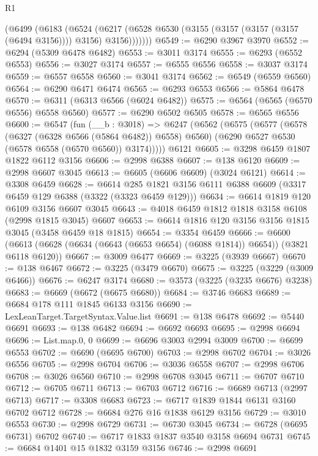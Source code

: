 \begin{lexlean}{R1}
\begin{coremodule}
        (@6499
          (@6183
            (@6524
              (@6217 (@6528 @6530 (@3155 (@3157 (@3157 (@3157 (@6494 @3156)))) @3156) @3156)))))))
@6549 := @6290 @3967 @3970
@6552 := @6294 (@5309 @6478 @6482)
@6553 := @3011 @3174
@6555 := @6293 (@6552 @6553)
@6556 := @3027 @3174
@6557 := @6555 @6556
@6558 := @3037 @3174
@6559 := @6557 @6558
@6560 := @3041 @3174
@6562 := @6549 (@6559 @6560)
@6564 := @6290 @6471 @6474
@6565 := @6293 @6553
@6566 := @5864 @6478
@6570 := @6311 (@6313 @6566 (@6024 @6482))
@6575 := @6564 (@6565 (@6570 @6556) @6558 @6560)
@6577 := @6290 @6502 @6505
@6578 := @6565 @6556
@6600 := @6547
    (fun (__b : @3018) =>
    @6247
      (@6562
        (@6575
          (@6577
            (@6578 (@6327 (@6328 @6566 (@5864 @6482)) @6558) @6560)
            (@6290 @6527 @6530 (@6578 @6558 (@6570 @6560)) @3174)))))
    @6121
@6605 := @3298 @6459 @1807 @1822 @6112 @3156
@6606 := @2998 @6388
@6607 := @138 @6120
@6609 := @2998 @6607 @3045
@6613 := @6605 (@6606 @6609) (@3024 @6121)
@6614 := @3308 @6459
@6628 := @6614
    @285
    @1821
    @3156
    @6111
    @6388
    @6609
    (@3317 @6459 @129 @6388 (@3322 (@3323 @6459 @129)))
@6634 := @6614 @1819 @120 @6109 @3156 @6607 @3045
@6643 := @4018 @6459 @1812 @1818 @3158 @6108 (@2998 @1815 @3045) @6607
@6653 := @6614 @1816 @120 @3156 @3156 @1815 @3045 (@3458 @6459 @18 @1815)
@6654 := @3354 @6459
@6666 := @6600 (@6613 (@6628 (@6634 (@6643 (@6653 @6654) (@6088 @1814)) @6654)) (@3821 @6118 @6120))
@6667 := @3009 @6477
@6669 := @3225 (@3939 @6667)
@6670 := @138 @6467
@6672 := @3225 (@3479 @6670)
@6675 := @3225 (@3229 (@3009 @6466))
@6676 := @6247 @3174
@6680 := @3573 (@3225 (@3235 @6676) @3238)
@6683 := @6669 (@6672 (@6675 @6680))
@6684 := @3746 @6683
@6689 := @6684 @178 @111 @1845 @6133 @3156
@6690 := LexLeanTarget.TargetSyntax.Value.list
@6691 := @138 @6478
@6692 := @5440 @6691
@6693 := @138 @6482
@6694 := @6692 @6693
@6695 := @2998 @6694
@6696 := List.map.{0, 0}
@6699 := @6696 @3003 @2994 @3009
@6700 := @6699 @6553
@6702 := @6690 (@6695 @6700)
@6703 := @2998 @6702
@6704 := @3026 @6556
@6705 := @2998 @6704
@6706 := @3036 @6558
@6707 := @2998 @6706
@6708 := @3026 @6560
@6710 := @2998 @6708 @3045
@6711 := @6707 @6710
@6712 := @6705 @6711
@6713 := @6703 @6712
@6716 := @6689 @6713 (@2997 @6713)
@6717 := @3308 @6683
@6723 := @6717 @1839 @1844 @6131 @3160 @6702 @6712
@6728 := @6684 @276 @16 @1838 @6129 @3156
@6729 := @3010 @6553
@6730 := @2998 @6729
@6731 := @6730 @3045
@6734 := @6728 (@6695 @6731) @6702
@6740 := @6717 @1833 @1837 @3540 @3158 @6694 @6731
@6745 := @6684 @1401 @15 @1832 @3159 @3156
@6746 := @2998 @6691

\end{coremodule}
\end{lexlean}
